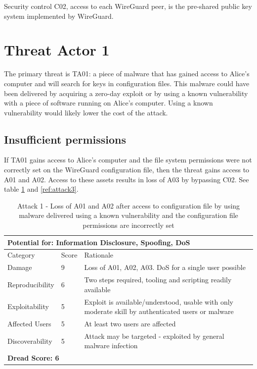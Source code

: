 \documentclass [11pt, proquest] {uwthesis}[2020/02/24]
\begin{document}
Security control C02, access to each WireGuard peer, is the pre-shared public key system implemented by WireGuard.

\section{Threat Actor 1}
The primary threat is TA01: a piece of malware that has gained access to Alice's computer and will search for keys in configuration files. This malware could have been delivered by acquiring a zero-day exploit or by using a known vulnerability with a piece of software running on Alice's computer. Using a known vulnerability would likely lower the cost of the attack.

\subsection{Insufficient permissions}
If TA01 gains access to Alice's computer and the file system permissions were not correctly set on the WireGuard configuration file, then the threat gains access to A01 and A02. Access to these assets results in loss of A03 by bypassing C02. 
See table \ref{ref:attack1} and \ref{ref:attack3}.
\begin{table}[H]
\begin{tabular}{|m{3cm}|m{.9cm}|p{27em} |}
\multicolumn{3}{l}{Potential for: Information Disclosure, Spoofing, DoS}                   \\
\hline
Category & Score & Rationale                                                    \\
\hline
Damage          & 9     & Loss of A01, A02, A03. DoS for a single user possible            \\
\hline
Reproducibility & 6     & Two steps required, tooling and scripting readily available    \\
\hline
Exploitability & 5      & Exploit is available/understood, usable with only moderate skill by authenticated users or malware \\
\hline
Affected Users  & 5     & At least two users are affected                     \\
\hline
Discoverability & 5     & Attack may be targeted - exploited by general malware infection \\
\hline
\multicolumn{3}{l}{\textbf{Dread Score: 6}} 
\end{tabular}
\caption{Attack 1 - Loss of A01 and A02 after access to configuration file by using malware delivered using a known vulnerability and the configuration file permissions are incorrectly set}
\label{ref:attack1}
\end{table}
\end{document}
